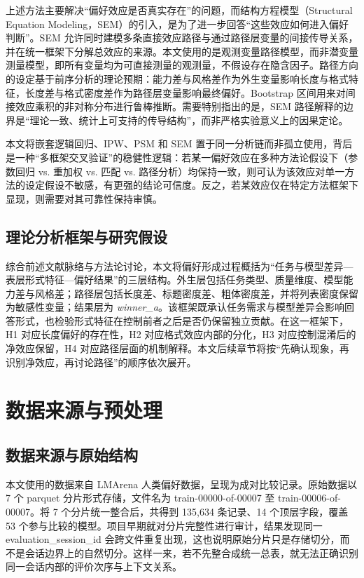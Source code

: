 \documentclass[9pt,a4paper,fontset=windows]{ctexart}
\theoremstyle{definition}
\numberwithin{equation}{section}
\newcommand{\winner}{\textit{winner\_a}}
\begin{document}
上述方法主要解决“偏好效应是否真实存在”的问题，而结构方程模型（Structural Equation Modeling，SEM）的引入，是为了进一步回答“这些效应如何进入偏好判断”。SEM 允许同时建模多条直接效应路径与通过路径层变量的间接传导关系，并在统一框架下分解总效应的来源。本文使用的是观测变量路径模型，而非潜变量测量模型，即所有变量均为可直接测量的观测量，不假设存在隐含因子。路径方向的设定基于前序分析的理论预期：能力差与风格差作为外生变量影响长度与格式特征，长度差与格式密度差作为路径层变量影响最终偏好。Bootstrap 区间用来对间接效应乘积的非对称分布进行鲁棒推断。需要特别指出的是，SEM 路径解释的边界是“理论一致、统计上可支持的传导结构”，而非严格实验意义上的因果定论。

本文将嵌套逻辑回归、IPW、PSM 和 SEM 置于同一分析链而非孤立使用，背后是一种“多框架交叉验证”的稳健性逻辑：若某一偏好效应在多种方法论假设下（参数回归 vs. 重加权 vs. 匹配 vs. 路径分析）均保持一致，则可认为该效应对单一方法的设定假设不敏感，有更强的结论可信度。反之，若某效应仅在特定方法框架下显现，则需要对其可靠性保持审慎。

\subsection{理论分析框架与研究假设}
综合前述文献脉络与方法论讨论，本文将偏好形成过程概括为“任务与模型差异—表层形式特征—偏好结果”的三层结构。外生层包括任务类型、质量维度、模型能力差与风格差；路径层包括长度差、标题密度差、粗体密度差，并将列表密度保留为敏感性变量；结果层为 \winner。该框架既承认任务需求与模型差异会影响回答形式，也检验形式特征在控制前者之后是否仍保留独立贡献。在这一框架下，H1 对应长度偏好的存在性，H2 对应格式效应内部的分化，H3 对应控制混淆后的净效应保留，H4 对应路径层面的机制解释。本文后续章节将按“先确认现象，再识别净效应，再讨论路径”的顺序依次展开。

\section{数据来源与预处理}

\subsection{数据来源与原始结构}
本文使用的数据来自 LMArena 人类偏好数据，呈现为成对比较记录。原始数据以 7 个 parquet 分片形式存储，文件名为 train-00000-of-00007 至 train-00006-of-00007。将 7 个分片统一整合后，共得到 135,634 条记录、14 个顶层字段，覆盖 53 个参与比较的模型。项目早期就对分片完整性进行审计，结果发现同一 evaluation\_session\_id 会跨文件重复出现，这也说明原始分片只是存储切分，而不是会话边界上的自然切分。这样一来，若不先整合成统一总表，就无法正确识别同一会话内部的评价次序与上下文关系。
\end{document}

